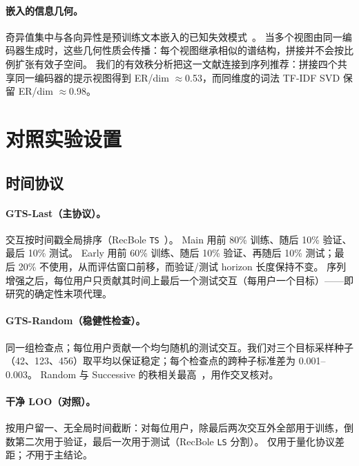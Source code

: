 \documentclass[sigconf,natbib=true,anonymous]{acmart}
\newcommand{\tfidf}{\textsc{TF-IDF}\xspace}
\begin{document}
\paragraph{嵌入的信息几何。}
奇异值集中与各向异性是预训练文本嵌入的已知失效模式~\cite{ethayarajh2019contextual}。
当多个视图由同一编码器生成时，这些几何性质会传播：每个视图继承相似的谱结构，拼接并不会按比例扩张有效子空间。
我们的有效秩分析把这一文献连接到序列推荐：拼接四个共享同一编码器的提示视图得到 ER/dim $\approx$0.53，而同维度的词法 \tfidf SVD 保留 ER/dim $\approx$0.98。

\section{对照实验设置}
\label{sec:setup}

\subsection{时间协议}
\label{sec:protocol}

\paragraph{GTS-Last（主协议）。}
交互按时间戳全局排序（RecBole \texttt{TS}~\cite{zhao2021recbole}）。
Main 用前 80\% 训练、随后 10\% 验证、最后 10\% 测试。
Early 用前 60\% 训练、随后 10\% 验证、再随后 10\% 测试；最后 20\% 不使用，从而评估窗口前移，而验证/测试 horizon 长度保持不变。
序列增强之后，每位用户只贡献其时间上最后一个测试交互（每用户一个目标）——即 \citet{gusak2025time} 研究的确定性末项代理。

\paragraph{GTS-Random（稳健性检查）。}
同一组检查点；每位用户贡献一个均匀随机的测试交互。我们对三个目标采样种子（42、123、456）取平均以保证稳定；每个检查点的跨种子标准差为 0.001--0.003。
Random 与 Successive 的秩相关最高~\cite{gusak2025time}，用作交叉核对。

\paragraph{干净 LOO（对照）。}
按用户留一、无全局时间截断：对每位用户，除最后两次交互外全部用于训练，倒数第二次用于验证，最后一次用于测试（RecBole \texttt{LS} 分割）。
仅用于量化协议差距；\emph{不}用于主结论。
\end{document}
